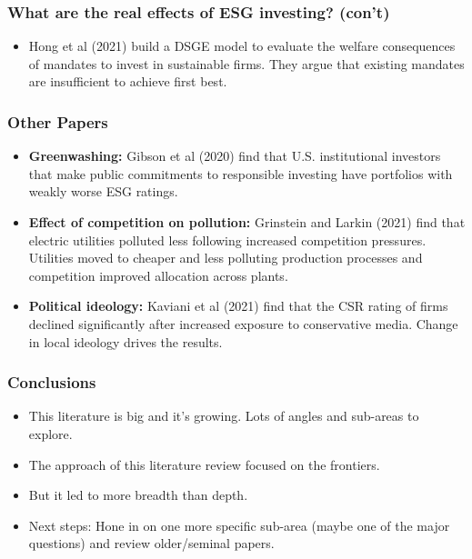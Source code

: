\documentclass[handout]{beamer}
\begin{document}
\begin{frame}
\frametitle{What are the real effects of ESG investing? (con't)}
\begin{itemize}
\item Hong et al (2021) build a DSGE model to evaluate the welfare consequences of mandates to invest in sustainable firms. They argue that existing mandates are insufficient to achieve first best.
\end{itemize}
\end{frame}



\begin{frame}
\frametitle{Other Papers}
\begin{itemize}[<+->]
\item \textbf{Greenwashing:} Gibson et al (2020) find that U.S. institutional investors that make public commitments to responsible investing have portfolios with weakly worse ESG ratings.
\bigskip
\item \textbf{Effect of competition on pollution:} Grinstein and Larkin (2021) find that electric utilities polluted less following increased competition pressures. Utilities moved to cheaper and less polluting production processes and competition improved allocation across plants.
\bigskip
\item \textbf{Political ideology:} Kaviani et al (2021) find that the CSR rating of firms declined significantly after increased exposure to conservative media. Change in local ideology drives the results.
\end{itemize}
\end{frame}


\begin{frame}
\frametitle{Conclusions}
\begin{itemize}[<+->]
\item This literature is big and it's growing.  Lots of angles and sub-areas to explore.
\bigskip
\item The approach of this literature review focused on the frontiers.
\bigskip
\item But it led to more breadth than depth.
\bigskip
\item Next steps: Hone in on one more specific sub-area (maybe one of the major questions) and review older/seminal papers.
\end{itemize}
\end{frame}
\end{document}
